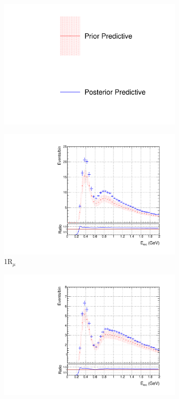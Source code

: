 \begin{figure}
\centering
\begin{subfigure}{.95\textwidth}
  \centering
  \includegraphics[width=0.25\linewidth]{figs/skspecleg}
\end{subfigure}
\begin{subfigure}{.49\textwidth}
  \centering
  \includegraphics[width=0.95\linewidth]{figs/skspecnumu}
  \caption{1R$_{\mu}$}
  \label{fig:skppnumu}
\end{subfigure}
\begin{subfigure}{.49\textwidth}
  \centering
  \includegraphics[width=0.95\linewidth]{figs/skspecnumubar}

\end{subfigure}
\end{figure}
